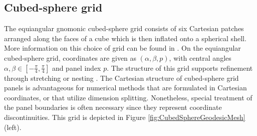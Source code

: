 \documentclass[gmd, manuscript]{copernicus}
\begin{document}
\subsection{Cubed-sphere grid} \label{sec:grid_cs}

The equiangular gnomonic cubed-sphere grid \citep{sadourny1972conservative, ronchi1996cubed, PL2007JCP} consists of six Cartesian patches arranged along the faces of a cube which is then inflated onto a spherical shell.  More information on this choice of grid can be found in \cite{ullrich2014global}.  On the equiangular cubed-sphere grid, coordinates are given as $(\alpha, \beta, p)$, with central angles $\alpha, \beta \in [- \frac{\pi}{4}, \frac{\pi}{4}]$ and panel index $p$.  The structure of this grid supports refinement through stretching \citep{Schmidt1977,harris2016high} or nesting \citep{harris2013two}.  The Cartesian structure of cubed-sphere grid panels is advantageous for numerical methods that are formulated in Cartesian coordinates, or that utilize dimension splitting.  Nonetheless, special treatment of the panel boundaries is often necessary since they represent coordinate discontinuities.  This grid is depicted in Figure \ref{fig:CubedSphereGeodesicMesh} (left).
\end{document}
